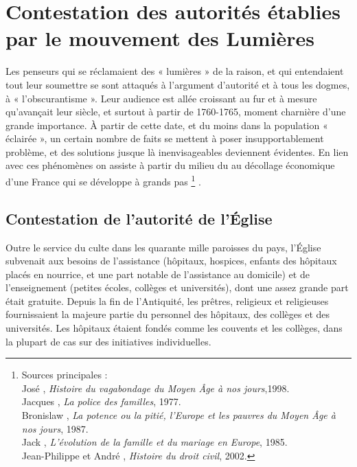 

\chapter[Contestation des autorités établies par le mouvement des Lumières]{Contestation des autorités établies par le mouvement des Lumières}


 Les penseurs qui se réclamaient des « lumières » de la raison, et qui entendaient tout leur soumettre se sont attaqués à l'argument d'autorité et à tous les dogmes, à « l'obscurantisme ». Leur audience est allée croissant au fur et à mesure qu'avançait leur siècle, et surtout à partir de 1760-1765, moment charnière d'une grande importance. À partir de cette date, et du moins dans la population « éclairée », un certain nombre de faits se mettent à poser insupportablement problème, et des solutions jusque là inenvisageables deviennent évidentes. En lien avec ces phénomènes on assiste à partir du milieu du  au décollage économique d'une France qui se développe à grands pas%
\footnote{Sources principales :
\\José , \emph{Histoire du vagabondage du Moyen Âge à nos jours},1998.
\\Jacques {}, \emph{La police des familles}, 1977.
\\Bronislaw {}, \emph{La potence ou la pitié, l'Europe et les pauvres du Moyen Âge à nos jours}, 1987.
\\Jack {}, \emph{L'évolution de la famille et du mariage en Europe}, 1985.
\\Jean-Philippe  et André , \emph{Histoire du droit civil}, 2002.}%
.

 
\section{Contestation de l'autorité de l'Église}

 Outre le service du culte dans les quarante mille paroisses du pays, l'Église subvenait aux besoins de l'assistance (hôpitaux, hospices, enfants des hôpitaux placés en nourrice, et une part notable de l'assistance au domicile) et de l'enseignement (petites écoles, collèges et universités), dont une assez grande part était gratuite. Depuis la fin de l'Antiquité, les prêtres, religieux et religieuses fournissaient la majeure partie du personnel des hôpitaux, des collèges et des universités. Les hôpitaux étaient fondés comme les couvents et les collèges, dans la plupart de cas sur des initiatives individuelles. 


